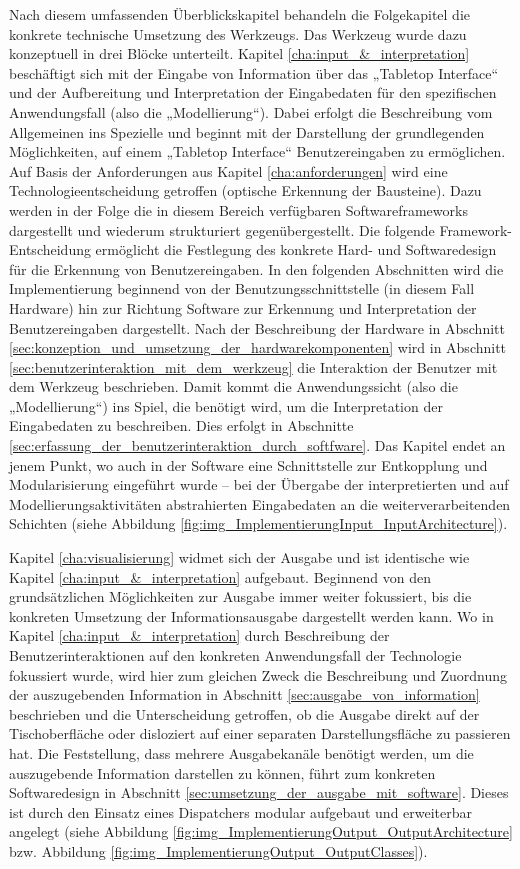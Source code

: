 Nach diesem umfassenden Überblickskapitel behandeln die Folgekapitel die konkrete technische Umsetzung des Werkzeugs. Das Werkzeug wurde dazu konzeptuell in drei Blöcke unterteilt. Kapitel \ref{cha:input_&_interpretation} beschäftigt sich mit der Eingabe von Information über das „Tabletop Interface“ und der Aufbereitung und Interpretation der Eingabedaten für den spezifischen Anwendungsfall (also die „Modellierung“). Dabei erfolgt die Beschreibung vom Allgemeinen ins Spezielle und beginnt mit der Darstellung der grundlegenden Möglichkeiten, auf einem „Tabletop Interface“ Benutzereingaben zu ermöglichen. Auf Basis der Anforderungen aus Kapitel \ref{cha:anforderungen} wird eine Technologieentscheidung getroffen (optische Erkennung der Bausteine). Dazu werden in der Folge die in diesem Bereich verfügbaren Softwareframeworks dargestellt und wiederum strukturiert gegenübergestellt. Die folgende Framework-Entscheidung ermöglicht die Festlegung des konkrete Hard- und Softwaredesign für die Erkennung von Benutzereingaben. In den folgenden Abschnitten wird die Implementierung beginnend von der Benutzungsschnittstelle (in diesem Fall Hardware) hin zur Richtung Software zur Erkennung und Interpretation der Benutzereingaben dargestellt. Nach der Beschreibung der Hardware in Abschnitt \ref{sec:konzeption_und_umsetzung_der_hardwarekomponenten} wird in Abschnitt \ref{sec:benutzerinteraktion_mit_dem_werkzeug} die Interaktion der Benutzer mit dem Werkzeug beschrieben. Damit kommt die Anwendungssicht (also die „Modellierung“) ins Spiel, die benötigt wird, um die Interpretation der Eingabedaten zu beschreiben. Dies erfolgt in Abschnitte \ref{sec:erfassung_der_benutzerinteraktion_durch_softfware}. Das Kapitel endet an jenem Punkt, wo auch in der Software eine Schnittstelle zur Entkopplung und Modularisierung eingeführt wurde -- bei der Übergabe der interpretierten und auf Modellierungsaktivitäten abstrahierten Eingabedaten an die weiterverarbeitenden Schichten (siehe Abbildung \ref{fig:img_ImplementierungInput_InputArchitecture}).

Kapitel \ref{cha:visualisierung} widmet sich der Ausgabe und ist identische wie Kapitel \ref{cha:input_&_interpretation} aufgebaut. Beginnend von den grundsätzlichen Möglichkeiten zur Ausgabe immer weiter fokussiert, bis die konkreten Umsetzung der Informationsausgabe dargestellt werden kann. Wo in Kapitel \ref{cha:input_&_interpretation} durch Beschreibung der Benutzerinteraktionen auf den konkreten Anwendungsfall der Technologie fokussiert wurde, wird hier zum gleichen Zweck die Beschreibung und Zuordnung der auszugebenden Information in Abschnitt \ref{sec:ausgabe_von_information} beschrieben und die Unterscheidung getroffen, ob die Ausgabe direkt auf der Tischoberfläche oder disloziert auf einer separaten Darstellungsfläche zu passieren hat. Die Feststellung, dass mehrere Ausgabekanäle benötigt werden, um die auszugebende Information darstellen zu können, führt zum konkreten Softwaredesign in Abschnitt \ref{sec:umsetzung_der_ausgabe_mit_software}. Dieses ist durch den Einsatz eines Dispatchers modular aufgebaut und erweiterbar angelegt (siehe Abbildung \ref{fig:img_ImplementierungOutput_OutputArchitecture} bzw. Abbildung \ref{fig:img_ImplementierungOutput_OutputClasses}).

